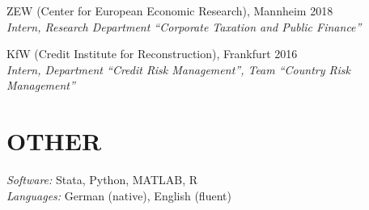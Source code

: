 \documentclass{res}
\begin{document}
\begin{resume}
    ZEW (Center for European Economic Research), Mannheim \hfill 2018
    \\
    \emph{Intern, Research Department ``Corporate Taxation and Public Finance''}

    KfW (Credit Institute for Reconstruction), Frankfurt \hfill 2016
    \\
    \emph{Intern, Department ``Credit Risk Management'', Team ``Country Risk Management''}
  
\section{OTHER}
\vspace{0.05in}
    \emph{Software:} Stata, Python, MATLAB, R
    \\[0.5em]
    \emph{Languages:} German (native), English (fluent)
 

\thispagestyle{lastpage} 

\end{resume}
\end{document}
